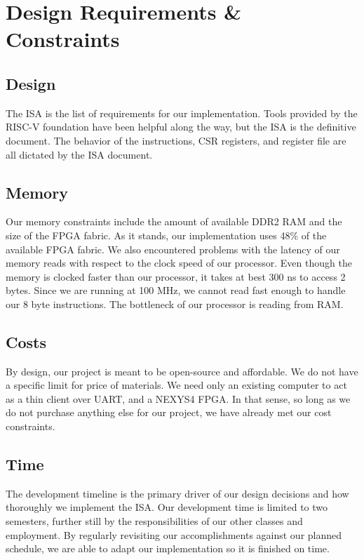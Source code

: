 \documentclass{article}
\begin{document}
\section{Design Requirements \& Constraints}

\subsection{Design}
  The ISA is the list of requirements for our implementation.  Tools provided by the RISC-V foundation
  have been helpful along the way, but the ISA is the definitive document.  The behavior of the instructions,
  CSR registers, and register file are all dictated by the ISA document.

\subsection{Memory}
  Our memory constraints include the amount of available DDR2 RAM and the size of the FPGA fabric.  As it stands, our implementation uses 48\% of the available FPGA fabric.  We also encountered problems with the latency of our memory reads with respect to the clock speed of our processor.  Even though the memory is clocked faster than our processor, it takes at best 300 ns to access 2 bytes.  Since we are running at 100 MHz, we cannot read fast enough to handle our 8 byte instructions.  The bottleneck of our processor is reading from RAM.

\subsection{Costs}
  By design, our project is meant to be open-source and affordable.  We do not have a specific limit for price
  of materials.  We need only an existing computer to act as a thin client over UART, and a NEXYS4 FPGA.  In that
  sense, so long as we do not purchase anything else for our project, we have already met our cost constraints.
  
\subsection{Time}
  The development timeline is the primary driver of our design decisions and how thoroughly we implement the ISA.
  Our development time is limited to two semesters, further still by the responsibilities of our other classes and
  employment.  By regularly revisiting our accomplishments against our planned schedule, we are able to adapt our
  implementation so it is finished on time.
\end{document}
